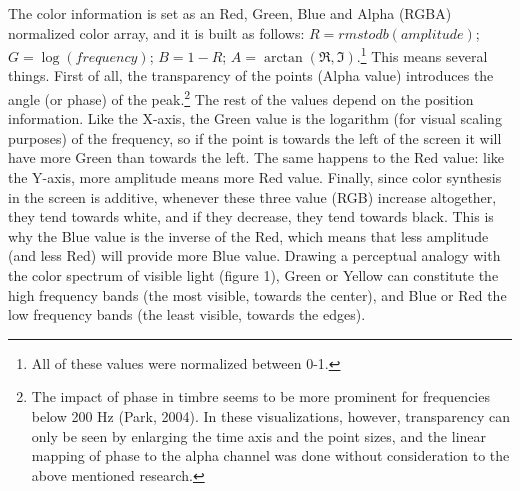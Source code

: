 \documentclass{article}
\begin{document}
%
%
%
\newpage
The color information is set as an Red, Green, Blue and Alpha (RGBA) normalized color array, and it is built as follows: $R=\mathit{rmstodb}(\mathit{amplitude})$;  $G=\log (\mathit{frequency})$;  $B=1-R$;  $A=\arctan (\Re ,\Im )$.\footnote{All of these values were normalized between 0-1.} This means several things. First of all, the transparency of the points (Alpha value) introduces the angle (or phase) of the peak.\footnote{The impact of phase in timbre seems to be more prominent for frequencies below 200 Hz (Park, 2004). In these visualizations, however, transparency can only be seen by enlarging the time axis and the point sizes, and the linear mapping of phase to the alpha channel was done without consideration to the above mentioned research.} 
 The rest of the values depend on the position information. Like the X-axis, the Green value is the logarithm (for visual scaling purposes) of the frequency, so if the point is towards the left of the screen it will have more Green than towards the left. The same happens to the Red value: like the Y-axis, more amplitude means more Red value. Finally, since color synthesis in the screen is additive, whenever these three value (RGB) increase altogether, they tend towards white, and if they decrease, they tend towards black. This is why the Blue value is the inverse of the Red, which means that less amplitude (and less Red) will provide more Blue value. Drawing a perceptual analogy with the color spectrum of visible light (figure 1), Green or Yellow can constitute the high frequency bands (the most visible, towards the center), and Blue or Red the low frequency bands (the least visible, towards the edges).
\end{document}
